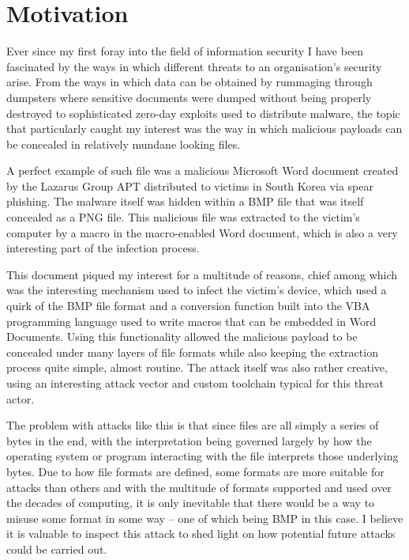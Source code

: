 \chapter{Motivation}
Ever since my first foray into the field of information security I have been fascinated by the ways in which
different threats to an organisation's security arise. From the ways in which data can be obtained by rummaging
through dumpsters where sensitive documents were dumped without being properly destroyed to sophisticated zero-day
exploits used to distribute malware, the topic that particularly caught my interest was the way in which malicious
payloads can be concealed in relatively mundane looking files.

A perfect example of such file was a malicious Microsoft Word document created by the Lazarus Group \acrlong{APT}
distributed to victims in South Korea via spear phishing. The malware itself was hidden within a \acrfull{BMP} file 
that was itself concealed as a \acrfull{PNG} file. This malicious file was extracted to the victim's computer by 
a macro in the macro-enabled Word document, which is also a very interesting part of the infection process. 

This document piqued my interest for a multitude of reasons, chief among which was the interesting mechanism used
to infect the victim's device, which used a quirk of the \acrshort{BMP} file format and a conversion function built into
the \acrfull{VBA} programming language used to write macros that can be embedded in Word Documents. Using this 
functionality allowed the malicious payload to be concealed under many layers of file formats while also keeping
the extraction process quite simple, almost routine. The attack itself was also rather creative, using an interesting
attack vector and custom toolchain typical for this threat actor.

The problem with attacks like this is that since files are all simply a series of bytes in the end, with the
interpretation being governed largely by how the operating system or program interacting with the file interprets 
those underlying bytes. Due to how file formats are defined, some formats are more suitable for attacks than others
and with the multitude of formats supported and used over the decades of computing, it is only inevitable that there
would be a way to misuse some format in some way -- one of which being \acrshort{BMP} in this case. I believe it is 
valuable to inspect this attack to shed light on how potential future attacks could be carried out. %

